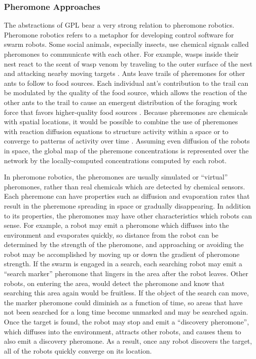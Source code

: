 \documentclass[]{article}
\begin{document}
\subsubsection{Pheromone Approaches}

The abstractions of GPL bear a very strong relation to pheromone robotics. 
Pheromone robotics refers to a metaphor for developing control software for swarm robots. 
Some social animals, especially insects, use chemical signals called pheromones to communicate with each other. 
For example, wasps inside their nest react to the scent of wasp venom by traveling to the outer surface of the nest and attacking nearby moving targets  \cite{jeanne1981alarm}.
Ants leave trails of pheremones for other ants to follow to food sources. 
Each individual ant's contribution to the trail can be modulated by the quality of the food source, which allows the reaction of the other ants to the trail to cause an emergent distribution of the foraging work force that favors higher-quality food sources \cite{sumpter2003nonlinearity}.
Because pheremones are chemicals with spatial locations, it would be possible to combine the use of pheremones with reaction diffusion equations to structure activity within a space or to converge to patterns of activity over time  \cite{turing1952chemical}. 
Assuming even diffusion of the robots in space, the global map of the pheremone concentrations is represented over the network by the locally-computed concentrations computed by each robot.

In pheromone robotics, the pheromones are usually simulated or ``virtual'' pheromones, rather than real chemicals which are detected by chemical sensors. 
Each pheremone can have properties such as diffusion and evaporation rates that result in the pheremone spreading in space or gradually disappearing. 
In addition to its properties, the pheromones may have other characteristics which robots can sense. 
For example, a robot may emit a pheromone which diffuses into the environment and evaporates quickly, so distance from the robot can be determined by the strength of the pheromone, and approaching or avoiding the robot may be accomplished by moving up or down the gradient of pheromone strength. 
If the swarm is engaged in a search, each searching robot may emit a ``search marker'' pheromone that lingers in the area after the robot leaves. 
Other robots, on entering the area, would detect the pheromone and know that searching this area again would be fruitless. 
If the object of the search can move, the marker pheromone could diminish as a function of time, so areas that have not been searched for a long time become unmarked and may be searched again. 
Once the target is found, the robot may stop and emit a ``discovery pheromone'', which diffuses into the environment, attracts other robots, and causes them to also emit a discovery pheromone. 
As a result, once any robot discovers the target, all of the robots quickly converge on its location. 
\end{document}
